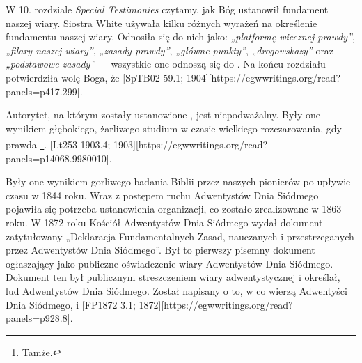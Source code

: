  \label{chap:authority}

W 10. rozdziale \textit{Special Testimonies} czytamy, jak Bóg ustanowił fundament naszej wiary. Siostra White używała kilku różnych wyrażeń na określenie fundamentu naszej wiary. Odnosiła się do nich jako: \textit{„platformę wiecznej prawdy”}, \textit{„filary naszej wiary”}, \textit{„zasady prawdy”}, \textit{„główne punkty”}, \textit{„drogowskazy”} oraz \textit{„podstawowe zasady”} — wszystkie one odnoszą się do . Na końcu rozdziału potwierdziła wolę Boga, że [SpTB02 59.1; 1904][https://egwwritings.org/read?panels=p417.299].

Autorytet, na którym zostały ustanowione , jest niepodważalny. Były one wynikiem głębokiego, żarliwego studium w czasie wielkiego rozczarowania, gdy prawda \footnote{Tamże.}. [Lt253-1903.4; 1903][https://egwwritings.org/read?panels=p14068.9980010].

Były one wynikiem gorliwego badania Biblii przez naszych pionierów po upływie czasu w 1844 roku. Wraz z postępem ruchu Adwentystów Dnia Siódmego pojawiła się potrzeba ustanowienia organizacji, co zostało zrealizowane w 1863 roku. W 1872 roku Kościół Adwentystów Dnia Siódmego wydał dokument zatytułowany „Deklaracja Fundamentalnych Zasad, nauczanych i przestrzeganych przez Adwentystów Dnia Siódmego”. Był to pierwszy pisemny dokument ogłaszający  jako publiczne oświadczenie wiary Adwentystów Dnia Siódmego. Dokument ten był publicznym streszczeniem wiary adwentystycznej i określał,  lud Adwentystów Dnia Siódmego. Został napisany  o to, w co wierzą Adwentyści Dnia Siódmego,  i [FP1872 3.1; 1872][https://egwwritings.org/read?panels=p928.8].

